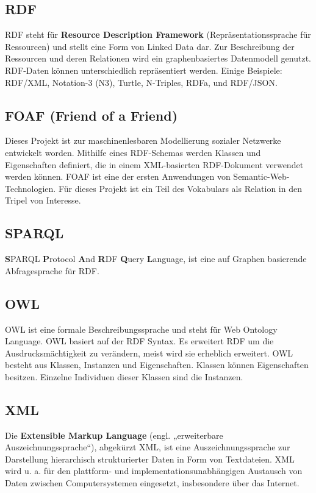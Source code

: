 \documentclass[11pt,a4paper]{article}
\begin{document}
\subsection{RDF}
RDF steht für \textbf{Resource Description Framework} (Repräsentationssprache für Ressourcen) und stellt eine
Form von Linked Data dar. Zur Beschreibung der Ressourcen und deren Relationen wird ein 
graphenbasiertes Datenmodell genutzt. RDF-Daten können unterschiedlich repräsentiert werden.
Einige Beispiele: RDF/XML, Notation-3 (N3), Turtle, N-Triples, RDFa, und RDF/JSON.
\subsection{FOAF (Friend of a Friend)}
Dieses  Projekt ist zur maschinenlesbaren Modellierung sozialer Netzwerke  entwickelt worden. Mithilfe eines RDF-Schemas werden Klassen und  Eigenschaften definiert, die in einem XML-basierten RDF-Dokument  verwendet werden können. FOAF ist eine der ersten Anwendungen von  Semantic-Web-Technologien.
Für dieses Projekt ist ein Teil des Vokabulars als Relation in den Tripel von Interesse.
\subsection{SPARQL}
\textbf{S}PARQL \textbf{P}rotocol \textbf{A}nd \textbf{R}DF \textbf{Q}uery \textbf{L}anguage, ist eine auf Graphen basierende Abfragesprache für RDF.
\subsection{OWL}
OWL ist eine formale Beschreibungssprache und steht für Web Ontology Language. OWL basiert auf der RDF Syntax. Es erweitert RDF um die Ausdrucksmächtigkeit zu verändern, meist wird sie erheblich erweitert. OWL besteht aus Klassen, Instanzen und Eigenschaften. Klassen können Eigenschaften besitzen. Einzelne Individuen dieser Klassen sind die Instanzen.

\subsection{XML}
Die \textbf{Extensible Markup Language} (engl. „erweiterbare Auszeichnungssprache“), abgekürzt XML, ist eine Auszeichnungssprache zur Darstellung hierarchisch strukturierter Daten in Form von Textdateien. XML wird u. a. für den plattform- und implementationsunabhängigen Austausch von Daten zwischen Computersystemen eingesetzt, insbesondere über das Internet.
\end{document}
